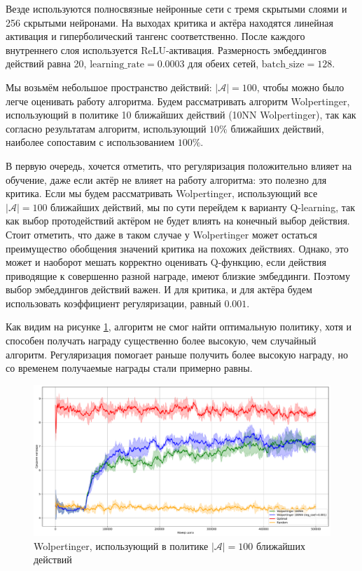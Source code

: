 \documentclass[a4paper, 12pt]{article}
\begin{document}
Везде используются полносвязные нейронные сети с тремя скрытыми слоями и 256 скрытыми нейронами. На выходах критика и актёра находятся линейная активация и гиперболический тангенс соответственно. После каждого внутреннего слоя используется ReLU-активация. Размерность эмбеддингов действий равна 20,
$\text{learning\_rate}=0.0003$ для обеих сетей, $\text{batch\_size}=128$.

Мы возьмём небольшое пространство действий: $|\mathcal{A}| = 100$, чтобы можно было легче оценивать работу алгоритма. Будем рассматривать алгоритм Wolpertinger, использующий в политике 10 ближайших действий (10NN Wolpertinger), так как согласно результатам \cite{wolpertinger} алгоритм, использующий $10\%$ ближайших действий, наиболее сопоставим с использованием $100\%$.

В первую очередь, хочется отметить, что регуляризация положительно влияет на обучение, даже если актёр не влияет на работу алгоритма: это полезно для критика. Если мы будем рассматривать Wolpertinger, использующий все $|\mathcal{A}|=100$ ближайших действий, мы по сути перейдем к варианту Q-learning, так как выбор протодействий актёром не будет влиять на конечный выбор действия.
Стоит отметить, что даже в таком случае у Wolpertinger может остаться преимущество обобщения значений критика на похожих действиях. Однако, это может и наоборот мешать корректно оценивать Q-функцию, если действия приводящие к совершенно разной награде, имеют близкие эмбеддинги. Поэтому выбор эмбеддингов действий важен.
И для критика, и для актёра будем использовать коэффициент регуляризации, равный $0.001$.

Как видим на рисунке \ref{fig:100NN}, алгоритм не смог найти оптимальную политику, хотя и способен получать награду существенно более высокую, чем случайный алгоритм. Регуляризация помогает раньше получить более высокую награду, но со временем получаемые награды стали примерно равны.

\begin{figure}[H]
	\captionsetup{font=scriptsize}
	\centering
    		\includegraphics[width=1.0\textwidth]{pics/100NN.pdf}
   \captionsetup{justification=centering}
   \caption{Wolpertinger, использующий в политике $|\mathcal{A}|=100$ ближайших действий}
   \label{fig:100NN}
\end{figure}
\end{document}
